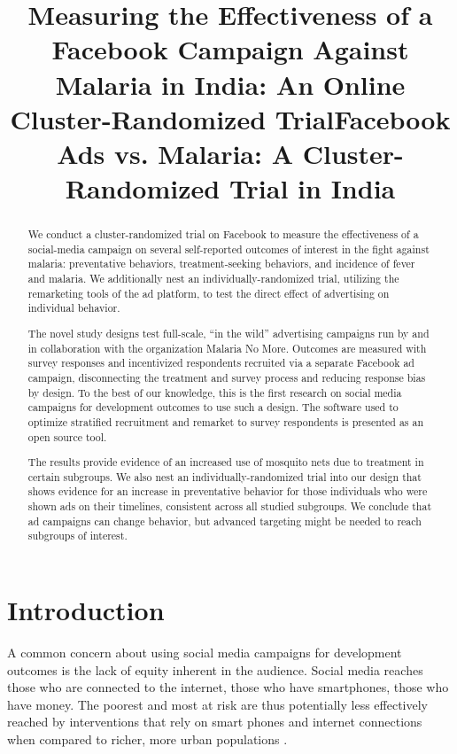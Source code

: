 \documentclass[a4paper,12pt]{article}
\title{Measuring the Effectiveness of a Facebook Campaign Against Malaria in India: An Online Cluster-Randomized Trial}
\title{Facebook Ads vs. Malaria: A Cluster-Randomized Trial in India}
\theoremstyle{proposition}
\begin{document}
\maketitle
 
\begin{abstract}
We conduct a cluster-randomized trial on Facebook to measure the effectiveness of a social-media campaign on several self-reported outcomes of interest in the fight against malaria: preventative behaviors, treatment-seeking behaviors, and incidence of fever and malaria. We additionally nest an individually-randomized trial, utilizing the remarketing tools of the ad platform, to test the direct effect of advertising on individual behavior.

The novel study designs test full-scale, ``in the wild'' advertising campaigns run by and in collaboration with the organization Malaria No More. Outcomes are measured with survey responses and incentivized respondents recruited via a separate Facebook ad campaign, disconnecting the treatment and survey process and reducing response bias by design. To the best of our knowledge, this is the first research on social media campaigns for development outcomes to use such a design. The software used to optimize stratified recruitment and remarket to survey respondents is presented as an open source tool.

The results provide evidence of an increased use of mosquito nets due to treatment in certain subgroups. We also nest an individually-randomized trial into our design that shows evidence for an increase in preventative behavior for those individuals who were shown ads on their timelines, consistent across all studied subgroups. We conclude that ad campaigns can change behavior, but advanced targeting might be needed to reach subgroups of interest.



\end{abstract}

\clearpage

\section{Introduction}

A common concern about using social media campaigns for development outcomes is the lack of equity inherent in the audience. Social media reaches those who are connected to the internet, those who have smartphones, those who have money. The poorest and most at risk are thus potentially less effectively reached by interventions that rely on smart phones and internet connections when compared to richer, more urban populations \cite{ref}.
\end{document}
